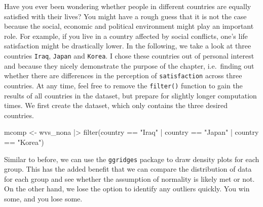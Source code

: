 \documentclass[
  letterpaper,
  DIV=11,
  numbers=noendperiod]{scrreprt}
\newenvironment{Shaded}{\begin{snugshade}}{\end{snugshade}}
\newcommand{\FunctionTok}[1]{\textcolor[rgb]{0.28,0.35,0.67}{#1}}
\newcommand{\NormalTok}[1]{\textcolor[rgb]{0.00,0.23,0.31}{#1}}
\newcommand{\OtherTok}[1]{\textcolor[rgb]{0.00,0.23,0.31}{#1}}
\newcommand{\SpecialCharTok}[1]{\textcolor[rgb]{0.37,0.37,0.37}{#1}}
\newcommand{\StringTok}[1]{\textcolor[rgb]{0.13,0.47,0.30}{#1}}
\begin{document}
Have you ever been wondering whether people in different countries are
equally satisfied with their lives? You might have a rough guess that it
is not the case because the social, economic and political environment
might play an important role. For example, if you live in a country
affected by social conflicts, one's life satisfaction might be
drastically lower. In the following, we take a look at three countries
\texttt{Iraq}, \texttt{Japan} and \texttt{Korea}. I chose these
countries out of personal interest and because they nicely demonstrate
the purpose of the chapter, i.e.~finding out whether there are
differences in the perception of \texttt{satisfaction} across three
countries. At any time, feel free to remove the \texttt{filter()}
function to gain the results of all countries in the dataset, but
prepare for slightly longer computation times. We first create the
dataset, which only contains the three desired countries.

\begin{Shaded}
\begin{Highlighting}[]
\NormalTok{mcomp }\OtherTok{\textless{}{-}}
\NormalTok{  wvs\_nona }\SpecialCharTok{|\textgreater{}}
  \FunctionTok{filter}\NormalTok{(country }\SpecialCharTok{==} \StringTok{"Iraq"} \SpecialCharTok{|}
\NormalTok{           country }\SpecialCharTok{==} \StringTok{"Japan"} \SpecialCharTok{|}
\NormalTok{           country }\SpecialCharTok{==} \StringTok{"Korea"}\NormalTok{)}
\end{Highlighting}
\end{Shaded}

Similar to before, we can use the \texttt{ggridges} package to draw
density plots for each group. This has the added benefit that we can
compare the distribution of data for each group and see whether the
assumption of normality is likely met or not. On the other hand, we lose
the option to identify any outliers quickly. You win some, and you lose
some.
\end{document}
